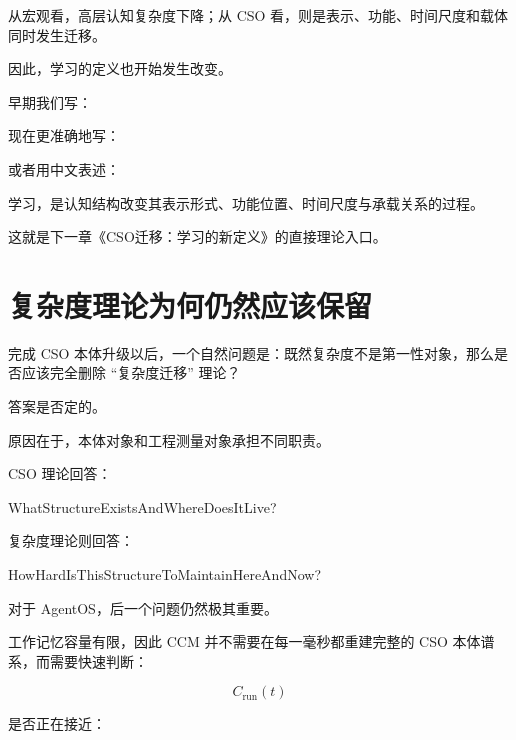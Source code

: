 从宏观看，高层认知复杂度下降；从 CSO 看，则是表示、功能、时间尺度和载体同时发生迁移。

因此，学习的定义也开始发生改变。

早期我们写：

\begin{statementbox}
\centering
{}
\end{statementbox}

现在更准确地写：

\begin{statementbox}
\centering
{}
\end{statementbox}

或者用中文表述：

\begin{statementbox}
学习，是认知结构改变其表示形式、功能位置、时间尺度与承载关系的过程。
\end{statementbox}

这就是下一章《CSO迁移：学习的新定义》的直接理论入口。

\section{复杂度理论为何仍然应该保留}
\label{sec:why-keep-complexity}

完成 CSO 本体升级以后，一个自然问题是：既然复杂度不是第一性对象，那么是否应该完全删除 ``复杂度迁移'' 理论？

答案是否定的。

原因在于，本体对象和工程测量对象承担不同职责。

CSO 理论回答：

\begin{statementbox}
WhatStructureExistsAndWhereDoesItLive?
\end{statementbox}

复杂度理论则回答：

\begin{statementbox}
HowHardIsThisStructureToMaintainHereAndNow?
\end{statementbox}

对于 AgentOS，后一个问题仍然极其重要。

工作记忆容量有限，因此 CCM 并不需要在每一毫秒都重建完整的 CSO 本体谱系，而需要快速判断：

\[
C_{\mathrm{run}}(t)
\]

是否正在接近：


